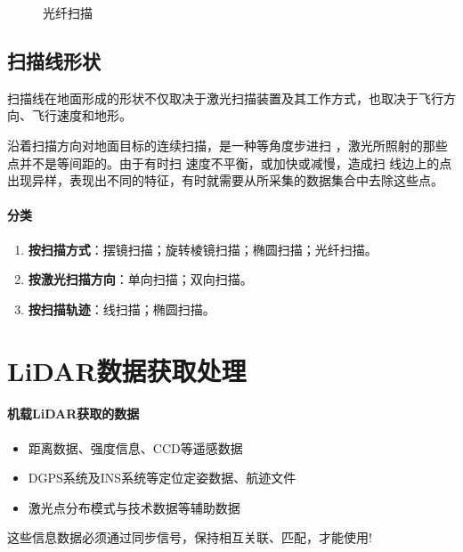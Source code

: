 \begin{enumerate}
\begin{figure}[htbp]
			\caption{光纤扫描}
			\label{fig:光纤扫描}
		\end{figure}
\end{enumerate} %

\subsection{扫描线形状} %
扫描线在地面形成的形状不仅取决于激光扫描装置及其工作方式，也取决于飞行方向、飞行速度和地形。

沿着扫描方向对地面目标的连续扫描，是一种等角度步进扫 ，激光所照射的那些点并不是等间距的。由于有时扫 速度不平衡，或加快或减慢，造成扫 线边上的点出现异样，表现出不同的特征，有时就需要从所采集的数据集合中去除这些点。

\paragraph{分类}
\begin{enumerate}
	\item \textbf{按扫描方式}：摆镜扫描；旋转棱镜扫描；椭圆扫描；光纤扫描。
	\item \textbf{按激光扫描方向}：单向扫描；双向扫描。
	\item \textbf{按扫描轨迹}：线扫描；椭圆扫描。
\end{enumerate}

\section{LiDAR数据获取处理}

\paragraph{机载LiDAR获取的数据}
\begin{itemize}
	\item 距离数据、强度信息、CCD等遥感数据
	\item DGPS系统及INS系统等定位定姿数据、航迹文件
	\item 激光点分布模式与技术数据等辅助数据
\end{itemize}
这些信息数据必须通过同步信号，保持相互关联、匹配，才能使用!


